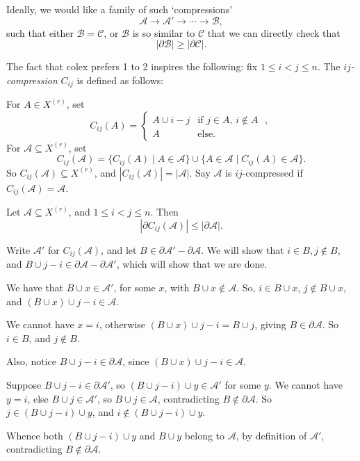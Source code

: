 \documentclass[12pt]{article}
\begin{document}
Ideally, we would like a family of such `compressions'
\[
\mathcal{A} \to \mathcal{A}' \to \cdots \to \mathcal{B},
\]
such that either $\mathcal{B} = \mathcal{C}$, or $\mathcal{B}$ is so similar to $\mathcal{C}$ that we can directly check that
\[
|\partial \mathcal{B}| \geq |\partial \mathcal{C}|.
\]


The fact that colex prefers 1 to 2 inspires the following: fix $1 \leq i < j \leq n$. The \emph{$ij$-compression} $C_{ij}$ is defined as follows:

For $A \in X^{(r)}$, set
\[
C_{ij}(A) =
\begin{cases}
	A \cup i - j &\text{if $j \in A$, $i \not \in A$ },\\
	A &\text{else.}
\end{cases}
\]
For $\mathcal{A} \subseteq X^{(r)}$, set
\[
	C_{ij}(\mathcal{A}) = \{ C_{ij}(A) \mid A \in \mathcal{A}\} \cup \{A \in \mathcal{A} \mid C_{ij}(A) \in \mathcal{A}\}.
\]
So $C_{ij}(\mathcal{A}) \subseteq X^{(r)}$, and $|C_{ij}(\mathcal{A})| = |\mathcal{A}|$. Say $\mathcal{A}$ is $ij$-compressed if $C_{ij}(\mathcal{A}) = \mathcal{A}$.

\begin{lemma}
	Let $\mathcal{A} \subseteq X^{(r)}$, and $1 \leq i < j \leq n$. Then
	\[
	|\partial C_{ij}(\mathcal{A})| \leq |\partial\mathcal{A}|.
	\]
\end{lemma}

\begin{proofbox}
	Write $\mathcal{A}'$ for $C_{ij}(\mathcal{A})$, and let $B \in \partial \mathcal{A}' - \partial \mathcal{A}$. We will show that $i \in B, j \not \in B$, and $B \cup j - i \in \partial \mathcal{A} - \partial \mathcal{A}'$, which will show that we are done.

	We have that $B \cup x \in \mathcal{A}'$, for some $x$, with $B \cup x \not \in \mathcal{A}$. So, $i \in B \cup x$, $j \not \in B \cup x$, and $(B \cup x) \cup j - i \in \mathcal{A}$.

	We cannot have $x = i$, otherwise $(B \cup x) \cup j - i = B \cup j$, giving $B \in \partial \mathcal{A}$. So $i \in B$, and $j \not \in B$.

	Also, notice $B \cup j - i \in \partial \mathcal{A}$, since $(B \cup x) \cup j - i \in \mathcal{A}$.

	Suppose $B \cup j - i \in \partial \mathcal{A}'$, so $(B \cup j - i) \cup y \in \mathcal{A}'$ for some $y$. We cannot have $y = i$, else $B \cup j \in \mathcal{A}'$, so $B \cup j \in \mathcal{A}$, contradicting $B \not \in \partial \mathcal{A}$. So $j \in (B \cup j - i) \cup y$, and $i \not \in (B \cup j - i) \cup y$.

	Whence both $(B \cup j - i) \cup y$ and $B \cup y$ belong to $\mathcal{A}$, by definition of $\mathcal{A}'$, contradicting $B \not \in \partial \mathcal{A}$.
\end{proofbox}
\end{document}

